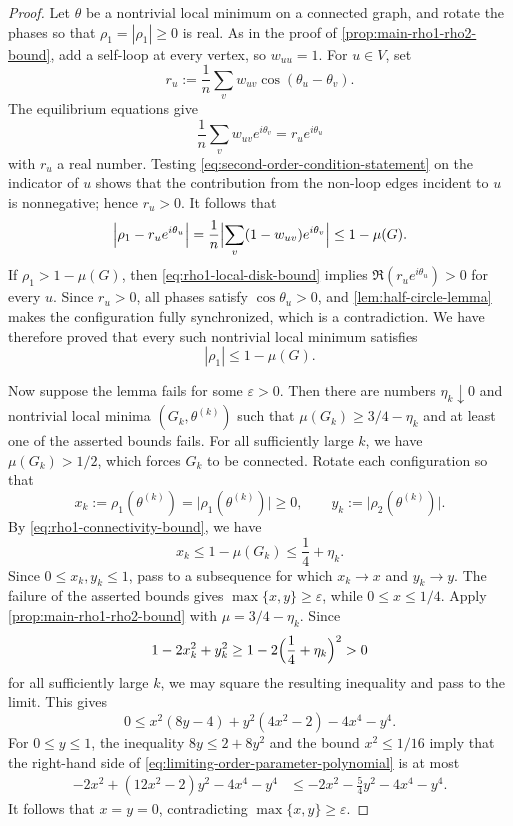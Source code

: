 \documentclass[reqno,11pt]{amsart}
\theoremstyle{definition}
\newcommand{\abs}[1]{\left\lvert #1\right\rvert}
\begin{document}
\begin{proof}
Let $\theta$ be a nontrivial local minimum on a connected graph, and rotate the phases so that $\rho_1=\abs{\rho_1}\ge0$ is real.  As in the proof
of \cref{prop:main-rho1-rho2-bound}, add a self-loop at every vertex, so
$w_{uu}=1$.  For $u\in V$, set
\[
    r_u:=\frac1n\sum_vw_{uv}\cos(\theta_u-\theta_v).
\]
The equilibrium equations give
\[
    \frac1n\sum_vw_{uv}e^{i\theta_v}=r_u e^{i\theta_u}
\]
with $r_u$ a real number. Testing \eqref{eq:second-order-condition-statement} on the indicator of
$u$ shows that the contribution from the non-loop edges incident to $u$
is nonnegative; hence $r_u > 0$.  It follows that
\begin{equation}\label{eq:rho1-local-disk-bound}
    \Bigl|\rho_1-r_u e^{i\theta_u}  \Bigr|
    =\frac1n\Bigl|\sum_v(1-w_{uv})e^{i\theta_v}\Bigr|
    \le1-\mu(G).
\end{equation}
If $\rho_1>1-\mu(G)$, then \eqref{eq:rho1-local-disk-bound} implies $\Re(r_u e^{i\theta_u})>0$ for every $u$.  Since
$r_u>0$, all phases satisfy $\cos\theta_u>0$, and
\cref{lem:half-circle-lemma} makes the configuration fully synchronized, which is a contradiction.  We have therefore proved that every such nontrivial
local minimum satisfies
\begin{equation}\label{eq:rho1-connectivity-bound}
    \abs{\rho_1}\le1-\mu(G).
\end{equation}

Now suppose the lemma fails for some $\varepsilon>0$.  Then there are numbers $\eta_k\downarrow0$ and nontrivial local minima
$(G_k,\theta^{(k)})$ such that
$\mu(G_k)\ge3/4-\eta_k$ and at least one of the asserted bounds fails.
For all sufficiently large $k$, we have $\mu(G_k)>1/2$, which forces
$G_k$ to be connected.  Rotate each configuration so that
\[
    x_k:=\rho_1(\theta^{(k)})
        =\bigl|\rho_1(\theta^{(k)})\bigr|\ge0,
    \qquad
    y_k:=\bigl|\rho_2(\theta^{(k)})\bigr|.
\]
By \eqref{eq:rho1-connectivity-bound}, we have
\[
    x_k\le1-\mu(G_k)\le\frac14+\eta_k.
\]
Since $0\le x_k,y_k\le1$, pass to a subsequence for which
$x_k\to x$ and $y_k\to y$.  The failure of the asserted bounds gives
$\max\{x,y\}\ge\varepsilon$, while $0\le x\le1/4$. Apply \cref{prop:main-rho1-rho2-bound} with
$\mu=3/4-\eta_k$.  Since
\[
    1-2x_k^2+y_k^2
    \ge1-2\Bigl(\frac14+\eta_k\Bigr)^2>0
\]
for all sufficiently large $k$, we may square the resulting inequality
and pass to the limit.  This gives
\begin{equation}\label{eq:limiting-order-parameter-polynomial}
0\le x^2(8y-4)+y^2(4x^2-2)-4x^4-y^4.
\end{equation}
For $0\le y\le1$, the inequality $8y\le2+8y^2$ and the bound
$x^2\le1/16$ imply that the right-hand side of
\eqref{eq:limiting-order-parameter-polynomial} is at most
\begin{align*}
    -2x^2+(12x^2-2)y^2-4x^4-y^4
    &\le-2x^2-\frac54y^2-4x^4-y^4.
\end{align*}
It follows that $x=y=0$, contradicting
$\max\{x,y\}\ge\varepsilon$.
\end{proof}
\end{document}
